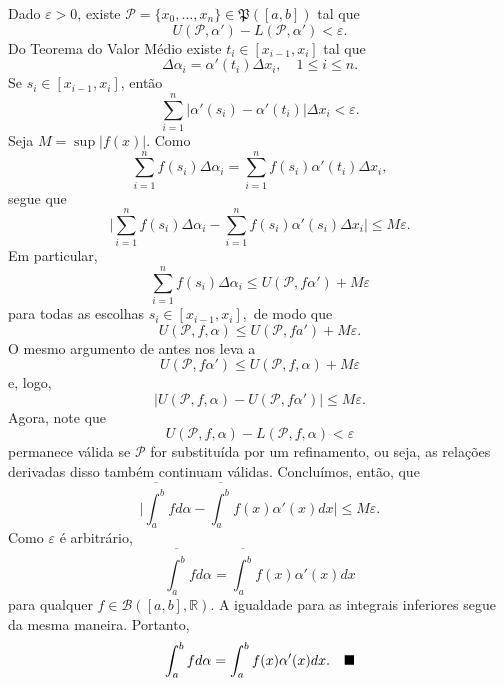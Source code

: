 \documentclass[analysis_notes.tex]{subfiles}
\begin{document}
\begin{proof*}
	Dado \(\varepsilon > 0\), existe \(\mathcal{P} = \{x_{0},\dotsc ,x_{n}\}\in \mathfrak{P}([a, b])\) tal que
	\[
		U(\mathcal{P}, \alpha ') - L(\mathcal{P}, \alpha') < \varepsilon .
	\]
	Do \hypertarget{mean_value}{Teorema do Valor Médio} existe \(t_{i}\in [x_{i-1}, x_{i}]\) tal que
	\[
		\Delta \alpha_{i} = \alpha'(t_{i})\Delta x_{i},\quad 1\leq i\leq n.
	\]
	Se \(s_{i}\in [x_{i-1}, x_{i}]\), então
	\[
		\sum\limits_{i=1}^{n}|\alpha '(s_{i}) - \alpha '(t_{i})|\Delta x_{i} < \varepsilon .
	\]
	Seja \(M = \sup|f(x)|\). Como
	\[
		\sum\limits_{i=1}^{n}f(s_{i})\Delta \alpha_{i} = \sum\limits_{i=1}^{n}f(s_{i})\alpha'(t_{i})\Delta x_{i},
	\]
	segue que
	\[
		\biggl\vert \sum\limits_{i=1}^{n}f(s_{i})\Delta \alpha_{i} - \sum\limits_{i=1}^{n}f(s_{i})\alpha'(s_{i})\Delta x_{i} \biggr\vert \leq M\varepsilon .
	\]
	Em particular,
	\[
		\sum\limits_{i=1}^{n}f(s_{i})\Delta \alpha_{i} \leq U(\mathcal{P}, f\alpha') + M\varepsilon
	\]
	para todas as escolhas \(s_{i}\in [x_{i-1}, x_{i}],\) de modo que
	\[
		U(\mathcal{P}, f, \alpha )\leq U(\mathcal{P}, fa') + M\varepsilon .
	\]
	O mesmo argumento de antes nos leva a
	\[
		U(\mathcal{P}, f\alpha') \leq U(\mathcal{P}, f, \alpha ) + M\varepsilon
	\]
	e, logo,
	\[
		|U(\mathcal{P}, f, \alpha ) - U(\mathcal{P}, f\alpha ')| \leq M\varepsilon .
	\]
	Agora, note que
	\[
		U(\mathcal{P}, f, \alpha ) - L(\mathcal{P}, f, \alpha ) < \varepsilon
	\]
	permanece válida se \(\mathcal{P}\) for substituída por um refinamento, ou seja, as relações derivadas disso
	também continuam válidas. Concluímos, então, que
	\[
		\biggl\vert \overline{\int_{a}^{b}}f d\alpha - \overline{\int_{a}^{b}}f(x)\alpha '(x)dx \biggr\vert\leq M\varepsilon .
	\]
	Como \(\varepsilon \) é arbitrário,
	\[
		\overline{\int_{a}^{b}}fd\alpha = \overline{\int_{a}^{b}}f(x)\alpha '(x)dx
	\]
	para qualquer \(f\in \mathcal{B}([a, b], \mathbb{R}).\) A igualdade para as integrais inferiores segue da mesma maneira. Portanto,
	\[
		\int_{a}^{b}fd\alpha = \int_{a}^{b}f(x)\alpha '(x)dx.\quad \text{$\blacksquare$}
	\]
\end{proof*}
\end{document}
